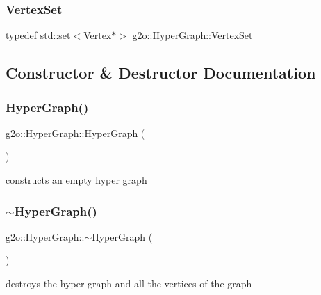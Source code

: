 \subsubsection{\texorpdfstring{Vertex\+Set}{VertexSet}}
{\footnotesize\ttfamily typedef std\+::set$<$\mbox{\hyperlink{classg2o_1_1_hyper_graph_1_1_vertex}{Vertex}}$\ast$$>$ \mbox{\hyperlink{classg2o_1_1_hyper_graph_a703938cdb4bb636860eed55a2489d70c}{g2o\+::\+Hyper\+Graph\+::\+Vertex\+Set}}}



\subsection{Constructor \& Destructor Documentation}
\mbox{\label{classg2o_1_1_hyper_graph_a833632b111cfc7cf08b842ae3cb43d41}} 
\subsubsection{\texorpdfstring{Hyper\+Graph()}{HyperGraph()}}
{\footnotesize\ttfamily g2o\+::\+Hyper\+Graph\+::\+Hyper\+Graph (\begin{DoxyParamCaption}{ }\end{DoxyParamCaption})}



constructs an empty hyper graph 

\mbox{\label{classg2o_1_1_hyper_graph_a0ef6e1d65e0f9171a518bce3fc559693}} 
\subsubsection{\texorpdfstring{$\sim$\+Hyper\+Graph()}{~HyperGraph()}}
{\footnotesize\ttfamily g2o\+::\+Hyper\+Graph\+::$\sim$\+Hyper\+Graph (\begin{DoxyParamCaption}{ }\end{DoxyParamCaption})\hspace{0.3cm}{\ttfamily [virtual]}}



destroys the hyper-\/graph and all the vertices of the graph 



